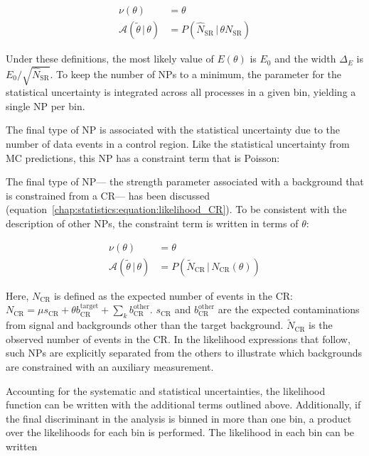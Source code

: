 \begin{equation}
\begin{aligned}
\nu(\theta) &= \theta \\
\mathscr{A}(\tilde{\theta}\,|\,\theta) &=
P(\hat{N}_{\textrm{SR}}\,|\,\theta N_{\textrm{SR}})
\end{aligned}
\end{equation}

\noindent
Under these definitions, the most likely value of $E(\theta)$ is $E_0$
and the width $\Delta_E$ is
$E_0/\sqrt{\hat{N}_{\textrm{SR}}}$. To keep the number of NPs to a
minimum, the parameter for the statistical uncertainty is integrated
across all processes in a given bin, yielding a single NP per bin. 

The final type of NP is associated with the statistical uncertainty
due to the number of data events in a control region. Like the
statistical uncertainty from MC predictions, this NP has a constraint
term that is Poisson:

The final type of NP--- the strength parameter associated with a
background that is constrained from a CR--- has been discussed
(equation~\ref{chap:statistics:equation:likelihood_CR}). To be
consistent with the description of other NPs, the constraint term is
written in terms of $\theta$:

\begin{equation}
\begin{aligned}
\nu(\theta) &= \theta \\
\mathscr{A}(\tilde{\theta}\,|\,\theta) &=
P(\tilde{N}_{\textrm{CR}}\,|\, N_{\textrm{CR}}(\theta))
\end{aligned}
\end{equation}

\noindent
Here, $N_{\textrm{CR}}$ is defined as the expected number of
events in the CR: $N_{\textrm{CR}} = \mu s_{\textrm{CR}} + \theta
b_{\textrm{CR}}^{\textrm{target}} + \sum_k
b_{\textrm{CR}}^{\textrm{other}}$. $s_{\textrm{CR}}$ and
$b_{\textrm{CR}}^{\textrm{other}}$ are the expected contaminations
from signal and backgrounds other than the target
background. $\tilde{N}_{\textrm{CR}}$ is the observed number of events
in the CR. In the
likelihood expressions that follow, such NPs are explicitly separated
from the others to illustrate which backgrounds are constrained with
an auxiliary measurement. 

Accounting for the systematic and statistical uncertainties, the
likelihood function can be written with the additional terms outlined
above. Additionally, if the final discriminant in the analysis is
binned in more than one bin, a product over the likelihoods for each
bin is performed. The likelihood in each bin can be written


